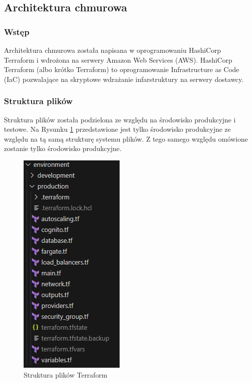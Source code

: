\documentclass[../../main.tex]{subfiles}
\begin{document}
\subsection{Architektura chmurowa}
    \subsubsection{Wstęp}
        Architektura chmurowa została napisana w oprogramowaniu HashiCorp Terraform i wdrożona na serwery Amazon Web Services (AWS)\cite{aws}. HashiCorp Terraform (albo krótko Terraform)\cite{terraform} to oprogramowanie Infrastructure as Code (IaC) pozwalające na skryptowe wdrażanie infarstruktury na serwery dostawcy.
    \subsubsection{Struktura plików}
        Struktura plików została podzielona ze względu na środowisko produkcyjne i testowe. Na Rysunku \ref{fig:aws-repo-structure} przedstawione jest tylko środowisko produkcyjne ze względu na tą samą strukturę systemu plików. Z tego samego względu omówione zostanie tylko środowisko produkcyjne.

        \begin{figure}[ht!]
            \centering
            \includegraphics[height=0.4\pdfpageheight]{images/aws-repo-structure.png}
            \caption{Struktura plików Terraform}
            \label{fig:aws-repo-structure}
        \end{figure}
\end{document}
